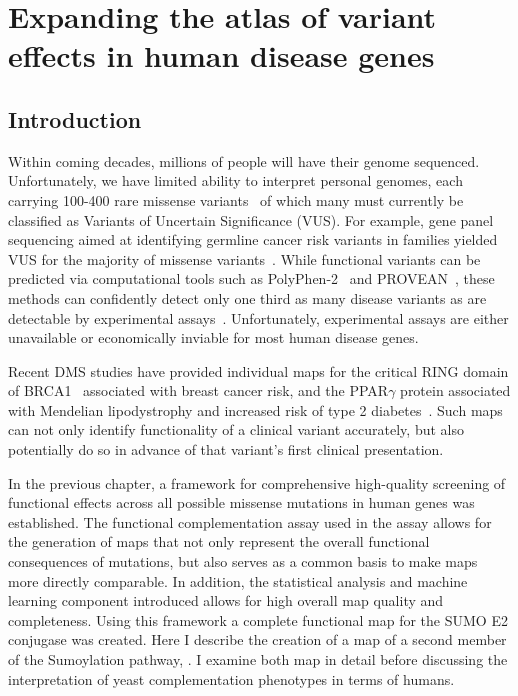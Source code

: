 
\chapter[Expanding the atlas of human disease variants]{Expanding the atlas of variant effects in human disease genes}
\label{ch:data2}

\section{Introduction}

Within coming decades, millions of people will have their genome sequenced. Unfortunately, we have limited ability to interpret personal genomes, each carrying 100-400 rare missense variants~\cite{the_1000_genomes_project_consortium_global_2015} of which many must currently be classified as Variants of Uncertain Significance (VUS). For example, gene panel sequencing aimed at identifying germline cancer risk variants in families yielded VUS for the majority of missense variants~\cite{maxwell_evaluation_2016}. While functional variants can be predicted via computational tools such as PolyPhen-2~\cite{adzhubei_predicting_2001} and PROVEAN~\cite{choi_predicting_2012}, these methods can confidently detect only one third as many disease variants as are detectable by experimental assays~\cite{sun_extended_2016}. Unfortunately, experimental assays are either unavailable or economically inviable for most human disease genes. 

Recent DMS studies have provided individual maps for the critical RING domain of BRCA1~\cite{starita_massively_2015} associated with breast cancer risk, and the PPAR$\gamma$ protein associated with Mendelian lipodystrophy and increased risk of type 2 diabetes~\cite{majithia_prospective_2016}. Such maps can not only identify functionality of a clinical variant accurately, but also potentially do so in advance of that variant's first clinical presentation. 

In the previous chapter, a framework for comprehensive high-quality screening of functional effects across all possible missense mutations in human genes was established. The functional complementation assay used in the assay allows for the generation of maps that not only represent the overall functional consequences of mutations, but also serves as a common basis to make maps more directly comparable. In addition, the statistical analysis and machine learning component introduced allows for high overall map quality and completeness. Using this framework a complete functional map for the SUMO E2 conjugase  was created. Here I describe the creation of a map of a second member of the Sumoylation pathway, . I examine both map in detail before discussing the interpretation of yeast complementation phenotypes in terms of humans. 

